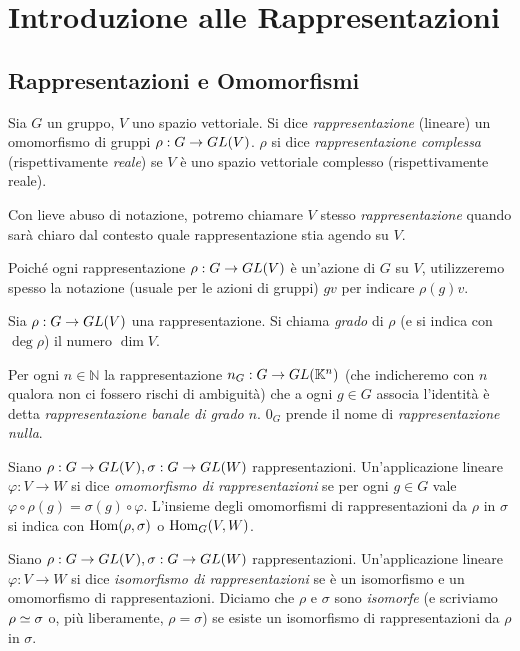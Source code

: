 \chapter{Introduzione alle Rappresentazioni}

\section{Rappresentazioni e Omomorfismi}

\begin{definition}
Sia $G$ un gruppo, $V$ uno spazio vettoriale. Si dice \emph{rappresentazione} (lineare) un omomorfismo di gruppi $\rho:G\to GL(V)$. $\rho$ si dice \emph{rappresentazione complessa} (rispettivamente \emph{reale}) se $V$ è uno spazio vettoriale complesso (rispettivamente reale).
\end{definition}

Con lieve abuso di notazione, potremo chiamare $V$ stesso \emph{rappresentazione} quando sarà chiaro dal contesto quale rappresentazione stia agendo su $V$.

Poiché ogni rappresentazione $\rho:G\to GL(V)$ è un'azione di $G$ su $V$, utilizzeremo spesso la notazione (usuale per le azioni di gruppi) $gv$ per indicare $\rho(g)v$.

\begin{definition}
Sia $\rho:G\to GL(V)$ una rappresentazione. Si chiama \emph{grado} di $\rho$ (e si indica con $\deg\rho$) il numero $\dim V$.
\end{definition}

\begin{example}
Per ogni $n\in\mathbb{N}$ la rappresentazione $n_G:G\to GL(\mathbb{K}^n)$ (che indicheremo con $n$ qualora non ci fossero rischi di ambiguità) che a ogni $g\in G$ associa l'identità è detta \emph{rappresentazione banale di grado $n$}. $0_G$ prende il nome di \emph{rappresentazione nulla}.
\end{example}

\begin{definition}
Siano $\rho:G\to GL(V),\allowbreak\sigma:G\to GL(W)$ rappresentazioni. Un'applicazione lineare $\varphi:V\to W$ si dice \emph{omomorfismo di rappresentazioni} se per ogni $g\in G$ vale $\varphi\circ\rho(g)=\sigma(g)\circ\varphi$. L'insieme degli omomorfismi di rappresentazioni da $\rho$ in $\sigma$ si indica con $\operatorname{Hom}(\rho,\sigma)$ o $\operatorname{Hom}_G(V, W)$.
\end{definition}

\begin{definition}
Siano $\rho:G\to GL(V),\allowbreak\sigma:G\to GL(W)$ rappresentazioni. Un'applicazione lineare $\varphi:V\to W$ si dice \emph{isomorfismo di rappresentazioni} se è un isomorfismo e un omomorfismo di rappresentazioni. Diciamo che $\rho$ e $\sigma$ sono \emph{isomorfe} (e scriviamo $\rho\simeq\sigma$ o, più liberamente, $\rho=\sigma$) se esiste un isomorfismo di rappresentazioni da $\rho$ in $\sigma$.
\end{definition}


